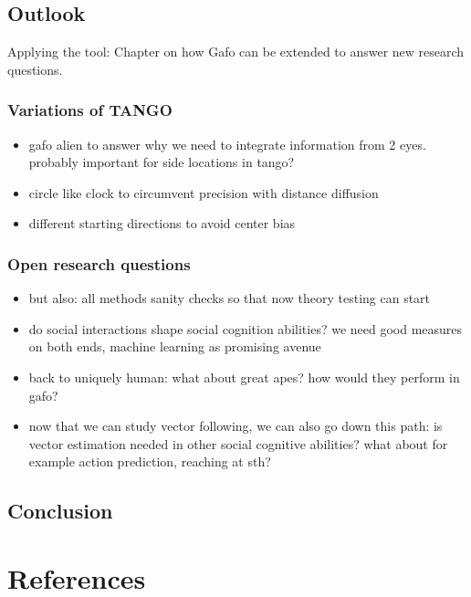 \documentclass[
]{scrbook}
\providecommand{\tightlist}{%
  \setlength{\itemsep}{0pt}\setlength{\parskip}{0pt}}
\begin{document}
\section{Outlook}\label{outlook}

Applying the tool: Chapter on how Gafo can be extended to answer new research questions.

\subsection{Variations of TANGO}\label{variations-of-tango}

\begin{itemize}
\tightlist
\item
  gafo alien to answer why we need to integrate information from 2 eyes. probably important for side locations in tango?
\item
  circle like clock to circumvent precision with distance diffusion
\item
  different starting directions to avoid center bias
\end{itemize}

\subsection{Open research questions}\label{open-research-questions}

\begin{itemize}
\tightlist
\item
  but also: all methods sanity checks so that now theory testing can start
\item
  do social interactions shape social cognition abilities? we need good measures on both ends, machine learning as promising avenue
\item
  back to uniquely human: what about great apes? how would they perform in gafo?
\item
  now that we can study vector following, we can also go down this path: is vector estimation needed in other social cognitive abilities? what about for example action prediction, reaching at sth?
\end{itemize}

\section{Conclusion}\label{conclusion}

\backmatter

\chapter{References}\label{references}
\end{document}
